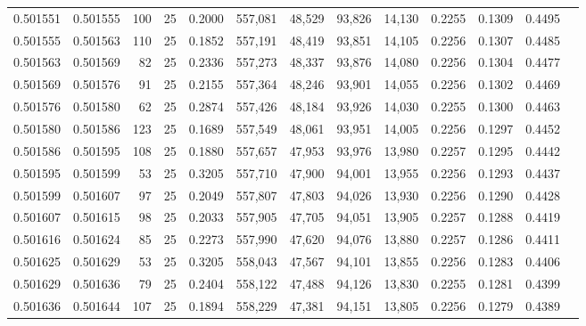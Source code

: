 \begin{tabular}{rrrrrrrrrrrrr}
0.501551 & 0.501555 & 100 &  25 &                                     0.2000 & 557,081 &  48,529 &  93,826 &  14,130 & 0.2255 & 0.1309 & 0.4495 \\
0.501555 & 0.501563 & 110 &  25 &                                     0.1852 & 557,191 &  48,419 &  93,851 &  14,105 & 0.2256 & 0.1307 & 0.4485 \\
0.501563 & 0.501569 &  82 &  25 &                                     0.2336 & 557,273 &  48,337 &  93,876 &  14,080 & 0.2256 & 0.1304 & 0.4477 \\
0.501569 & 0.501576 &  91 &  25 &                                     0.2155 & 557,364 &  48,246 &  93,901 &  14,055 & 0.2256 & 0.1302 & 0.4469 \\
0.501576 & 0.501580 &  62 &  25 &                                     0.2874 & 557,426 &  48,184 &  93,926 &  14,030 & 0.2255 & 0.1300 & 0.4463 \\
0.501580 & 0.501586 & 123 &  25 &                                     0.1689 & 557,549 &  48,061 &  93,951 &  14,005 & 0.2256 & 0.1297 & 0.4452 \\
0.501586 & 0.501595 & 108 &  25 &                                     0.1880 & 557,657 &  47,953 &  93,976 &  13,980 & 0.2257 & 0.1295 & 0.4442 \\
0.501595 & 0.501599 &  53 &  25 &                                     0.3205 & 557,710 &  47,900 &  94,001 &  13,955 & 0.2256 & 0.1293 & 0.4437 \\
0.501599 & 0.501607 &  97 &  25 &                                     0.2049 & 557,807 &  47,803 &  94,026 &  13,930 & 0.2256 & 0.1290 & 0.4428 \\
0.501607 & 0.501615 &  98 &  25 &                                     0.2033 & 557,905 &  47,705 &  94,051 &  13,905 & 0.2257 & 0.1288 & 0.4419 \\
0.501616 & 0.501624 &  85 &  25 &                                     0.2273 & 557,990 &  47,620 &  94,076 &  13,880 & 0.2257 & 0.1286 & 0.4411 \\
0.501625 & 0.501629 &  53 &  25 &                                     0.3205 & 558,043 &  47,567 &  94,101 &  13,855 & 0.2256 & 0.1283 & 0.4406 \\
0.501629 & 0.501636 &  79 &  25 &                                     0.2404 & 558,122 &  47,488 &  94,126 &  13,830 & 0.2255 & 0.1281 & 0.4399 \\
0.501636 & 0.501644 & 107 &  25 &                                     0.1894 & 558,229 &  47,381 &  94,151 &  13,805 & 0.2256 & 0.1279 & 0.4389 \\

\end{tabular}
